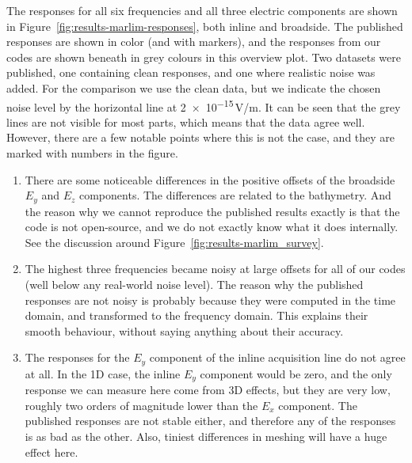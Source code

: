 \documentclass[
    paper,
  ]{geophysics}
\begin{document}
The responses for all six frequencies and all three electric components are shown in Figure~\ref{fig:results-marlim-responses}, both inline and broadside. The published responses are shown in color (and with markers), and the responses from our codes are shown beneath in grey colours in this overview plot.
%
%
Two datasets were published, one containing clean responses, and one where realistic noise was added. For the comparison we use the clean data, but we indicate the chosen noise level by the horizontal line at \num{2e-15}\,V/m. It can be seen that the grey lines are not visible for most parts, which means that the data agree well. However, there are a few notable points where this is not the case, and they are marked with numbers in the figure.
\begin{enumerate}
  \item There are some noticeable differences in the positive offsets of the broadside $E_y$ and $E_z$ components. The differences are related to the bathymetry. And the reason why we cannot reproduce the published results exactly is that the code is not open-source, and we do not exactly know what it does internally. See the discussion around Figure~\ref{fig:results-marlim_survey}.
  \item The highest three frequencies became noisy at large offsets for all of our codes (well below any real-world noise level). The reason why the published responses are not noisy is probably because they were computed in the time domain, and transformed to the frequency domain. This explains their smooth behaviour, without saying anything about their accuracy.
  \item The responses for the $E_y$ component of the inline acquisition line do not agree at all. In the 1D case, the inline $E_y$ component would be zero, and the only response we can measure here come from 3D effects, but they are very low, roughly two orders of magnitude lower than the $E_x$ component. The published responses are not stable either, and therefore any of the responses is as bad as the other. Also, tiniest differences in meshing will have a huge effect here.
\end{enumerate}
\end{document}
